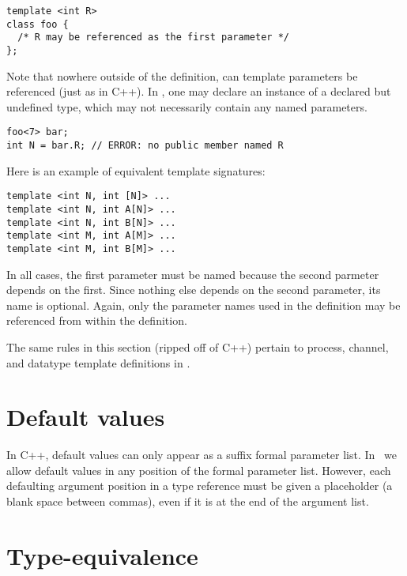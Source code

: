 \begin{verbatim}
template <int R>
class foo {
  /* R may be referenced as the first parameter */
};
\end{verbatim}

Note that nowhere outside of the definition, 
can template parameters be referenced (just as in C++).  
In \artxx, one may declare an instance of a declared but undefined type, 
which may not necessarily contain any named parameters.  

\begin{verbatim}
foo<7> bar;
int N = bar.R; // ERROR: no public member named R
\end{verbatim}

Here is an example of equivalent template signatures:

\begin{verbatim}
template <int N, int [N]> ...
template <int N, int A[N]> ...
template <int N, int B[N]> ...
template <int M, int A[M]> ...
template <int M, int B[M]> ...
\end{verbatim}

In all cases, the first parameter must be named because the second
parmeter depends on the first.  
Since nothing else depends on the second parameter, its name is optional.  
Again, only the parameter names used in the definition 
may be referenced from within the definition.  

The same rules in this section (ripped off of C++) pertain to
process, channel, and datatype template definitions in \artxx.


\section{Default values}
\label{sec:templates:default}

In C++, default values can only appear as a suffix formal parameter list.  
In \artxx\ we allow default values in any position of the formal 
parameter list.  
However, each defaulting argument position in a type reference
must be given a placeholder (a blank space between commas), 
even if it is at the end of the argument list.  


\section{Type-equivalence}
\label{sec:templates:equivalence}

